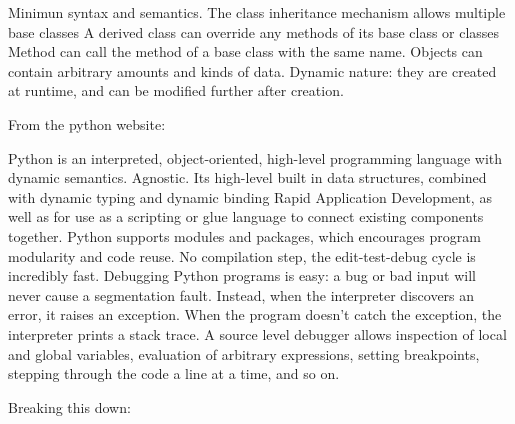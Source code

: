 Minimun syntax and semantics.
The class inheritance mechanism allows multiple base classes
A derived class can override any methods of its base class or classes
Method can call the method of a base class with the same name.
Objects can contain arbitrary amounts and kinds of data.
Dynamic nature: they are created at runtime, and can be modified further after creation.


From the python website:

Python is an interpreted, object-oriented, high-level programming language with dynamic semantics. Agnostic. 
Its high-level built in data structures, combined with dynamic typing and dynamic binding
Rapid Application Development, as well as for use as a scripting or glue language to connect existing components together.
Python supports modules and packages, which encourages program modularity and code reuse.
No compilation step, the edit-test-debug cycle is incredibly fast.
Debugging Python programs is easy: a bug or bad input will never cause a segmentation fault.
Instead, when the interpreter discovers an error, it raises an exception. When the program doesn't catch the exception, the interpreter prints a stack trace.
A source level debugger allows inspection of local and global variables, evaluation of arbitrary expressions, setting breakpoints, stepping through the code a line at a time, and so on. 
 

Breaking this down:

